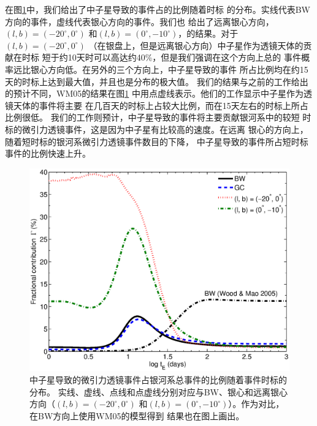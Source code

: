 在图\ref{ratio}中，我们给出了中子星导致的事件占的比例随着时标
的分布。实线代表BW方向的事件，虚线代表银心方向的事件。我们也
给出了远离银心方向，$(l,b)=(-20^{\circ},0^{\circ})$ 
和$(l,b)=(0^{\circ},-10^{\circ})$，的结果。对于$(l,b)=(-20^{\circ},0^{\circ})$
（在银盘上，但是远离银心方向）中子星作为透镜天体的贡献在时标
短于约10天时可以高达约40\%，但是我们强调在这个方向上总的
事件概率远比银心方向低。在另外的三个方向上，中子星导致的事件
所占比例均在约15天的时标上达到最大值，并且也是分布的极大值。
我们的结果与之前的工作给出的预计不同，WM05的结果在图\ref{ratio}
中用点虚线表示。他们的工作显示中子星作为透镜天体的事件将主要
在几百天的时标上占较大比例，而在15天左右的时标上所占比例很低。
我们的工作则预计，中子星导致的事件将主要贡献银河系中的较短
时标的微引力透镜事件，这是因为中子星有比较高的速度。在远离
银心的方向上，随着短时标的银河系微引力透镜事件数目的下降，
中子星导致的事件所占短时标事件的比例快速上升。

%
\begin{figure}
\begin{center}
  \includegraphics[width=4 in,trim=0 0 0 3cm]{ratio.eps}
%
\caption{中子星导致的微引力透镜事件占银河系总事件的比例随着事件时标的分布。
实线、虚线、点线和点虚线分别对应与BW、银心和远离银心方向（$(l,b)=(-20^{\circ},0^{\circ})$
和$(l,b)=(0^{\circ},-10^{\circ})$）。作为对比，在BW方向上使用WM05的模型得到
结果也在图上画出。}
\label{ratio}
\end{center}
\end{figure}
%

